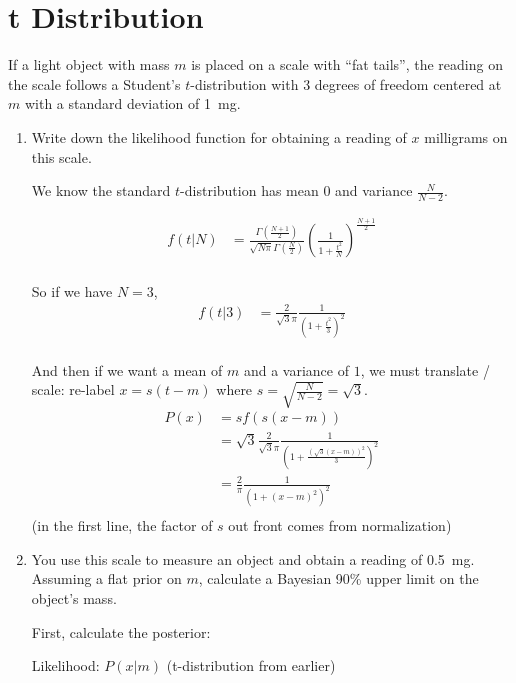 \section{t Distribution}

If a light object with mass $m$ is placed on a scale with ``fat tails'', the reading on the scale follows a Student's $t$-distribution with 3 degrees of freedom centered at $m$ with a standard deviation of \SI{1}{mg}.

\begin{enumerate}[label=\textbf{\Alph*}.]
    \item Write down the likelihood function for obtaining a reading of $x$ milligrams on this scale.

    We know the standard $t$-distribution has mean 0 and variance $\frac{N}{N-2}$.

    \begin{align*}
        f(t|N) &= \frac{\Gamma\left(\frac{N+1}{2}\right)}{\sqrt{N\pi}\Gamma\left(\frac{N}{2}\right)}\left(\frac{1}{1 + \frac{t^2}{N}}\right)^{\frac{N+1}{2}} \\
    \end{align*}

    So if we have $N=3$,
    \begin{align*}
        f(t|3) &= \frac{2}{\sqrt{3}\pi}\frac{1}{\left(1 + \frac{t^2}{3}\right)^{2}} \\
    \end{align*}

    And then if we want a mean of $m$ and a variance of $1$, we must translate / scale: re-label $x = s(t-m)$ where $s = \sqrt{\frac{N}{N-2}} = \sqrt{3}$.
    \begin{align*}
        P(x) &= sf(s(x-m)) \\
        &= \sqrt{3}\frac{2}{\sqrt{3}\pi}\frac{1}{\left(1 + \frac{(\sqrt{3}(x-m))^2}{3}\right)^{2}} \\
        &= \frac{2}{\pi}\frac{1}{\left(1 + (x-m)^2\right)^{2}} \\
    \end{align*}
    (in the first line, the factor of $s$ out front comes from normalization)

    \item You use this scale to measure an object and obtain a reading of \SI{0.5}{mg}. Assuming a flat prior on $m$, calculate a Bayesian 90\% upper limit on the object's mass.

    First, calculate the posterior:

    Likelihood: $P(x|m)$ (t-distribution from earlier)


\end{enumerate}
